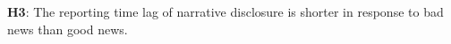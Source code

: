 \documentclass[a4paper]{article}
\begin{document}
\begin{spacing}{2}
\begin{center}
	\textbf{H3}: The reporting time lag of narrative disclosure is shorter in response to bad news than good news.
\end{center}

\begin{comment}
\subsection{Conditional, Unconditional and Narrative Conservatism: Usefulness}
The controversy regarding whether conservatism is a desirable property that enhances the usefulness of financial reporting persists. Traditionally, the usefulness of accounting information can be assessed in terms of how well it serves each of the two objectives of accounting---valuation and stewardship \fullcite{cascinoUsefulnessFinancialAccounting2017}. The valuation objective is to ``provide financial information about the reporting entity that is useful to existing and potential investors, lenders, and other creditors in making decisions about providing resources to the entity \cite[OB2]{fasbConceptualFrameworkFinancial2018b}". For financial information to be useful for valuation objective, it must be relevant and faithfully represent what it purports to represent. Faithful representation further requires neutrality, which means that a depiction must be ``not slanted, weighted, emphasized, deemphasized, or otherwise manipulated to increase the probability that financial information will be received favorably or unfavorably by users". The stewardship objective is to assess ``how efficiently and effectively the entity's management and governing board have discharged their responsibilities to use the entity's economic resources \cite[OB4]{fasbConceptualFrameworkFinancial2018b}". Although not separately stated in the Conceptual Framework as one primary purpose of financial reporting, the stewardship role of accounting dates back several millennia and has been one of the main reasons for the existence of accounting \cite{lennardStewardshipObjectivesFinancial2007, murphyDiscoursesSurroundingEvolution2013, pelgerPracticesStandardsettingAnalysis2016}. On the one hand, conservatism contradicts the valuation role of accounting by introducing downward bias in financial reporting and thus weakening its ability to faithfully represent firm performance. For example, unconditional conservatism encourages firms to anticipate and recognize losses before their realization, resulting in a systematic downward bias in asset valuation \fullcite<e.g.,>[]{wattsPositiveAccountingTheory1986}. Conditional conservatism requires higher verification for good news to be recognized than bad news, leading to asymmetric timeliness in gain and loss recognition in earnings \fullcite<e.g.,>[]{basuConservatismPrincipleAsymmetric1997}. On the other hand, conditional conservatism enhances the stewardship role of accounting by improving contract efficiency. For example, in compensation contracting conditional conservatism limits managers' ability to overstate earnings and thus maximizing personal wealth at the expense of other claimholders \fullcite<e.g.,>[]{wattsConservatismAccountingPart2003}.


\end{comment}
\end{spacing}
\end{document}

